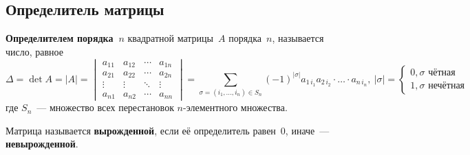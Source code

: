 \subsection{Определитель матрицы}
 \textbf{Определителем порядка~$n$} квадратной {матрицы~$A$} порядка~$n$, называется число, равное
\begin{equation}
\label{eq:determinant}
\Delta = \det A = |A| =
\begin{vmatrix}
a_{11} & a_{12} & \cdots & a_{1n} \\
a_{21} & a_{22} & \cdots & a_{2n} \\
\vdots & \vdots & \ddots & \vdots \\
a_{n1} & a_{n2} & \cdots & a_{nn}
\end{vmatrix} =
\sum_{\sigma = (i_1, \ldots, i_n) \in S_n} (-1)^{|\sigma|} a_{1\, i_1} a_{2\, i_2} \cdot \ldots \cdot a_{n\, i_n}, \ 
|\sigma| =
\begin{cases}
0, \sigma \text{ чётная} \\
1, \sigma \text{ нечётная}
\end{cases}
\end{equation}
где $S_n$~--- множество всех перестановок $n$-элементного множества.

Матрица называется \textbf{вырожденной}, если её определитель равен~$0$, иначе~--- \textbf{невырожденной}.

